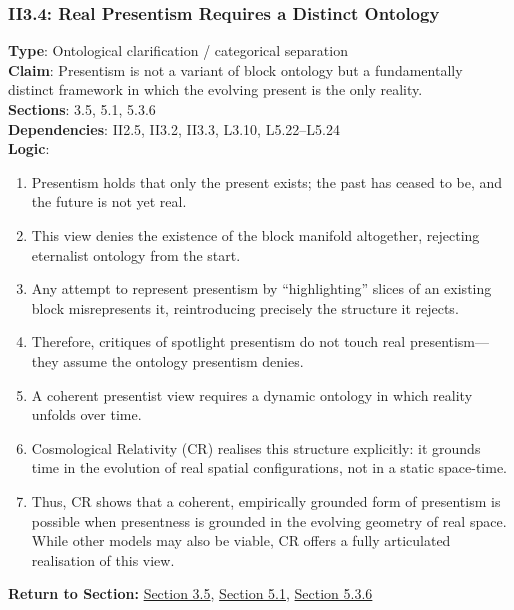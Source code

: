 \documentclass[12pt]{book}
\begin{document}
\subsubsection*{II3.4: Real Presentism Requires a Distinct Ontology}
\label{appendix:II3.4}
\textbf{Type}: Ontological clarification / categorical separation\\
\textbf{Claim}: Presentism is not a variant of block ontology but a fundamentally distinct framework in which the evolving present is the only reality.\\
\textbf{Sections}: 3.5, 5.1, 5.3.6\\
\textbf{Dependencies}: II2.5, II3.2, II3.3, L3.10, L5.22–L5.24\\
\textbf{Logic}:
\begin{enumerate}
    \item Presentism holds that only the present exists; the past has ceased to be, and the future is not yet real.
    \item This view denies the existence of the block manifold altogether, rejecting eternalist ontology from the start.
    \item Any attempt to represent presentism by ``highlighting'' slices of an existing block misrepresents it, reintroducing precisely the structure it rejects.
    \item Therefore, critiques of spotlight presentism do not touch real presentism---they assume the ontology presentism denies.
    \item A coherent presentist view requires a dynamic ontology in which reality unfolds over time.
    \item Cosmological Relativity (CR) realises this structure explicitly: it grounds time in the evolution of real spatial configurations, not in a static space-time.
    \item Thus, CR shows that a coherent, empirically grounded form of presentism is possible when presentness is grounded in the evolving geometry of real space. While other models may also be viable, CR offers a fully articulated realisation of this view.
\end{enumerate}
\textbf{Return to Section:} \hyperref[sec:3.5]{Section 3.5}, \hyperref[sec:5.1]{Section 5.1}, \hyperref[sec:5.3.6]{Section 5.3.6}
\end{document}
